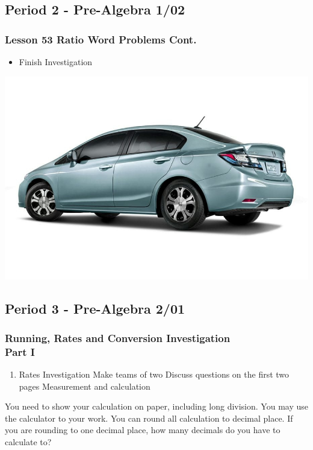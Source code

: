    	  \subsection[PA1/02]{Period 2 - Pre-Algebra 1/02}
   	    \begin{frame}[label=PA1_02]
   	    		\frametitle{Lesson 53 Ratio Word Problems Cont.}   	
    
                    \begin{itemize}
                    	\item Finish  Investigation 
                    \end{itemize}   
                    \vspace{-20pt}
                    \begin{center}
                    	\includegraphics[width=0.5\linewidth]{Images/honda_civic}
                    \end{center}      
                    \vspace{-20pt}
   	  \end{frame}
   	    	
\subsection[PA2/01]{Period 3 - Pre-Algebra 2/01}
   	 \begin{frame}[label=PA2_01]
   	      	\frametitle{Running, Rates and Conversion Investigation \\ Part I}   	
    
           \begin{enumerate}
   	        \item Rates Investigation
            \rightarrowitem Make teams of two 
            \rightarrowitem Discuss questions on the first two pages 
            \rightarrowitem Measurement and calculation
           \end{enumerate}
           
           	\begin{alertblock}{}
           		You need to show your calculation on paper, including long division. You may use the calculator to  your work.
           		You can round all calculation to  decimal place. If you are rounding to one decimal place, how many decimals do you have to calculate to?	
           	\end{alertblock}
           
           
   	  \end{frame}
    
